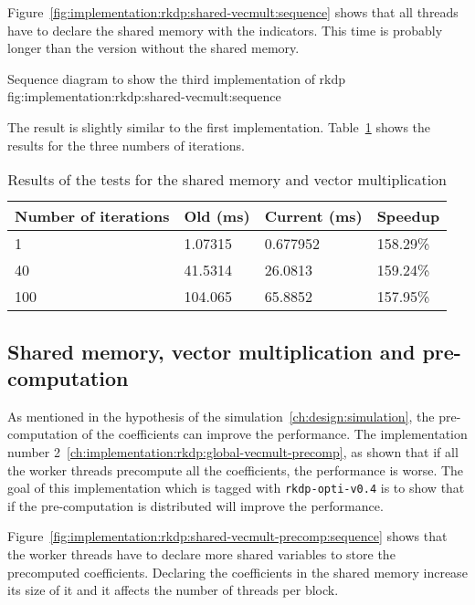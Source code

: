 Figure~\ref{fig:implementation:rkdp:shared-vecmult:sequence} shows that all
threads have to declare the shared memory with the indicators.
This time is probably longer than the version without the shared memory.

{Sequence diagram to show the third implementation of \acrshort{rkdp}}
{fig:implementation:rkdp:shared-vecmult:sequence}

The result is slightly similar to the first implementation.
Table~\ref{tab:implementation:rkdp:shared-vecmult:results} shows the results
for the three numbers of iterations.

\begin{table}[ht]
    \centering
    \begin{tabular}{|l|l|l|l|}
        \hline
        \textbf{Number of iterations} & \textbf{Old (ms)} & \textbf{Current (ms)} & \textbf{Speedup} \\
        \hline
        1 & 1.07315 & 0.677952 & 158.29\% \\
        \hline
        40 & 41.5314 & 26.0813 & 159.24\% \\
        \hline
        100 & 104.065 & 65.8852 & 157.95\% \\
        \hline
    \end{tabular}
    \caption{Results of the tests for the shared memory and vector multiplication}
    \label{tab:implementation:rkdp:shared-vecmult:results}
\end{table}

\subsection{Shared memory, vector multiplication and pre-computation}
\label{ch:implementation:rkdp:shared-vecmult-precomp}

As mentioned in the hypothesis of the simulation~\ref{ch:design:simulation}, the
pre-computation of the coefficients can improve the performance.
The implementation number 2~\ref{ch:implementation:rkdp:global-vecmult-precomp},
as shown that if all the worker threads precompute all the coefficients, the
performance is worse.
The goal of this implementation which is tagged with \texttt{rkdp-opti-v0.4} is
to show that if the pre-computation is distributed will improve the performance.

Figure~\ref{fig:implementation:rkdp:shared-vecmult-precomp:sequence} shows that
the worker threads have to declare more shared variables to store the
precomputed coefficients.
Declaring the coefficients in the shared memory increase its size of it and it
affects the number of threads per block.

